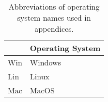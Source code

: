 \begin{table}
\centering
\caption{Abbreviations of operating system names used in appendices.}
\label{tab:keys-os}
\begin{tabular}{ll}
\toprule
{} & Operating System \\
\midrule
 Win &          Windows \\
 Lin &            Linux \\
 Mac &            MacOS \\
\bottomrule
\end{tabular}
\end{table}
\pagebreak